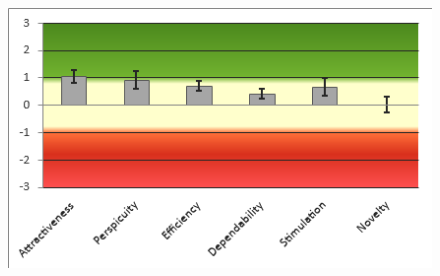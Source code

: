 \documentclass{article}
\begin{document}
	\begin{figure}[h]
		\includegraphics[width=\linewidth]{./Screenshots/Evaluation_result.png}
		\label{fig:evaluation_result}
	\end{figure}
	\par
	
\end{document}
